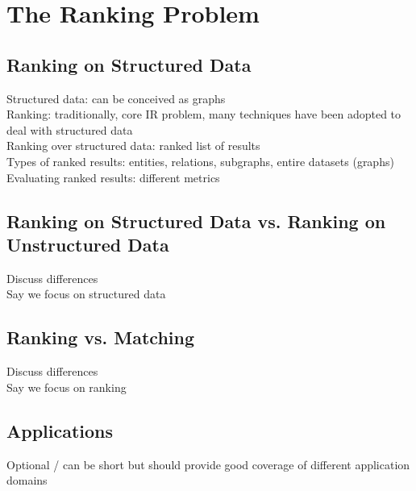 \section{The Ranking Problem}\label{sec:ranking}

\subsection{Ranking on Structured Data}
Structured data: can be conceived as graphs\\
Ranking: traditionally, core IR problem, many techniques have been adopted to deal with structured data\\
Ranking over structured data: ranked list of results\\
Types of ranked results: entities, relations, subgraphs, entire datasets (graphs)\\
Evaluating ranked results: different metrics\\

\subsection{Ranking on Structured Data vs. Ranking on Unstructured Data}
Discuss differences\\
Say we focus on structured data\\

\subsection{Ranking vs. Matching}
Discuss differences\\
Say we focus on ranking\\


\subsection{Applications} 
Optional / can be short but should provide good coverage of different application domains